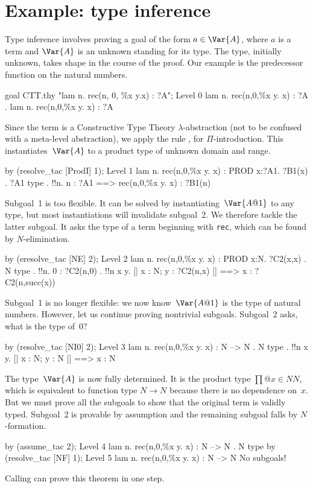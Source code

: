 \section{Example: type inference}
Type inference involves proving a goal of the form $a\in\Var{A}$, where $a$
is a term and $\Var{A}$ is an unknown standing for its type.  The type,
initially
unknown, takes shape in the course of the proof.  Our example is the
predecessor function on the natural numbers.
\begin{ttbox}
goal CTT.thy "lam n. rec(n, 0, \%x y.x) : ?A";
{\out Level 0}
{\out lam n. rec(n,0,\%x y. x) : ?A}
{. lam n. rec(n,0,\%x y. x) : ?A}
\end{ttbox}
Since the term is a Constructive Type Theory $\lambda$-abstraction (not to
be confused with a meta-level abstraction), we apply the rule
, for $\Pi$-introduction.  This instantiates~$\Var{A}$ to a
product type of unknown domain and range.
\begin{ttbox}
by (resolve_tac [ProdI] 1);
{\out Level 1}
{\out lam n. rec(n,0,\%x y. x) : PROD x:?A1. ?B1(x)}
{. ?A1 type}
{. !!n. n : ?A1 ==> rec(n,0,\%x y. x) : ?B1(n)}
\end{ttbox}
Subgoal~1 is too flexible.  It can be solved by instantiating~$\Var{A@1}$
to any type, but most instantiations will invalidate subgoal~2.  We
therefore tackle the latter subgoal.  It asks the type of a term beginning
with {\tt rec}, which can be found by $N$-elimination.
\begin{ttbox}
by (eresolve_tac [NE] 2);
{\out Level 2}
{\out lam n. rec(n,0,\%x y. x) : PROD x:N. ?C2(x,x)}
{. N type}
{. !!n. 0 : ?C2(n,0)}
{. !!n x y. [| x : N; y : ?C2(n,x) |] ==> x : ?C2(n,succ(x))}
\end{ttbox}
Subgoal~1 is no longer flexible: we now know~$\Var{A@1}$ is the type of
natural numbers.  However, let us continue proving nontrivial subgoals.
Subgoal~2 asks, what is the type of~0?
\begin{ttbox}
by (resolve_tac [NI0] 2);
{\out Level 3}
{\out lam n. rec(n,0,\%x y. x) : N --> N}
{. N type}
{. !!n x y. [| x : N; y : N |] ==> x : N}
\end{ttbox}
The type~$\Var{A}$ is now fully determined.  It is the product type
$\prod@{x\in N}N$, which is equivalent to function type $N\to N$ because
there is no dependence on~$x$.  But we must prove all the subgoals to show
that the original term is validly typed.  Subgoal~2 is provable by
assumption and the remaining subgoal falls by $N$-formation.
\begin{ttbox}
by (assume_tac 2);
{\out Level 4}
{\out lam n. rec(n,0,\%x y. x) : N --> N}
{. N type}
\ttbreak
by (resolve_tac [NF] 1);
{\out Level 5}
{\out lam n. rec(n,0,\%x y. x) : N --> N}
{\out No subgoals!}
\end{ttbox}
Calling  can prove this theorem in one step.

